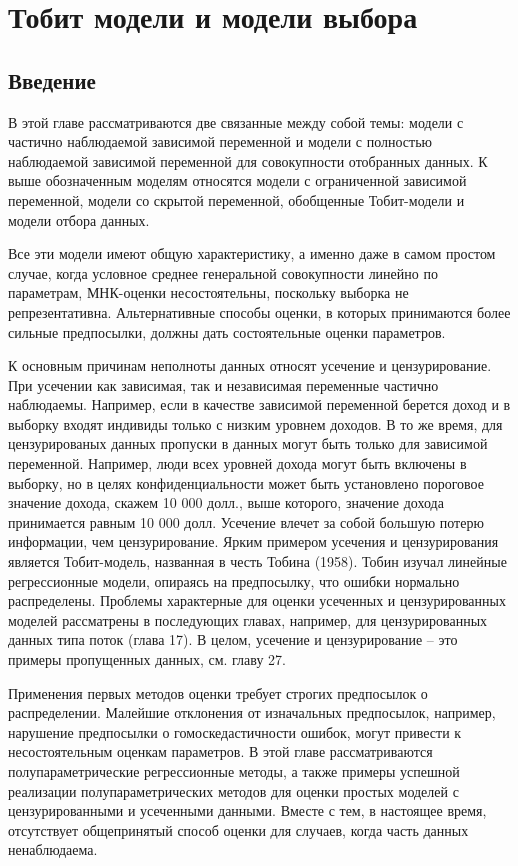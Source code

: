 
\chapter {Тобит модели и модели выбора}

\section{Введение}

В этой главе рассматриваются две связанные между собой темы: модели с частично наблюдаемой зависимой переменной и модели с полностью наблюдаемой зависимой переменной для совокупности отобранных данных. К выше обозначенным моделям относятся модели с ограниченной зависимой переменной, модели со скрытой переменной, обобщенные Тобит-модели и модели отбора данных. 

Все эти модели имеют общую характеристику, а именно даже в самом простом случае, когда условное среднее генеральной совокупности линейно по параметрам, МНК-оценки несостоятельны, поскольку выборка не репрезентативна. Альтернативные способы оценки, в которых принимаются более сильные предпосылки, должны дать состоятельные оценки параметров.

К основным причинам неполноты данных относят усечение и цензурирование. При усечении как зависимая, так и независимая переменные частично наблюдаемы. Например, если в качестве зависимой переменной берется доход и в выборку входят индивиды только с низким уровнем доходов. В то же время, для цензурированых данных пропуски в данных могут быть только для зависимой переменной. Например, люди всех уровней дохода могут быть включены в выборку, но в целях конфиденциальности может быть установлено пороговое значение дохода, скажем 10 000 долл., выше которого, значение дохода принимается равным 10 000 долл. Усечение влечет за собой большую потерю информации, чем цензурирование. Ярким примером усечения и цензурирования является Тобит-модель, названная в честь Тобина (1958). Тобин изучал линейные регрессионные модели, опираясь на предпосылку, что ошибки нормально распределены. Проблемы характерные для оценки усеченных и цензурированных моделей рассматрены в последующих главах, например, для цензурированных данных типа поток (глава 17). В целом, усечение и цензурирование -- это примеры пропущенных данных, см. главу 27.

Применения первых методов оценки требует строгих предпосылок о распределении. Малейшие отклонения от изначальных предпосылок, например, нарушение предпосылки о гомоскедастичности ошибок, могут привести к несостоятельным оценкам параметров. В этой главе рассматриваются полупараметрические регрессионные методы, а также примеры успешной реализации полупараметрических методов для оценки простых моделей с цензурированными и усеченными данными. Вместе с тем, в настоящее время, отсутствует общепринятый способ оценки для случаев, когда часть данных ненаблюдаема.

